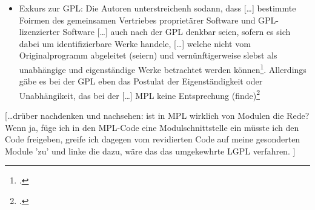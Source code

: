 \documentclass[DIV=calc,BCOR=5mm,11pt,headings=small,oneside,abstract=true, toc=bib]{scrartcl}
\begin{document}
\begin{itemize}
 \glqq{}[\ldots] dass die neu hinzugefügten Module in eigenständigen
 Dateien vorliegen, die selbst keine Bestandteile des Originalcodes
 enthalten\grqq{}\footcite[vgl.][354]{ArlBriVol2004a}
 \item Exkurs zur GPL: Die Autoren unterstreichenh sodann, dass \glqq{}[\ldots]
 bestimmte Foirmen des gemeinsamen Vertriebes proprietärer Software und
 GPL-lizenzierter Software [\ldots] auch nach der GPL denkbar seien\grqq{},
 sofern es sich dabei um identifizierbare Werke handele, \glqq{}[\ldots]
 welche nicht vom Originalprogramm abgeleitet (seiern) und
 vernünftigerweise slebst als unabhängige und eigenständige Werke
 betrachtet werden können\grqq{}\footcite[vgl.][354]{ArlBriVol2004a}. Allerdings
 gäbe es bei der GPL eben das Postulat der \glqq{}Eigenständigkeit\grqq{} oder
 \glqq{}Unabhängikeit\grqq{}, das bei der \glqq{}[\ldots] MPL keine
 Entsprechung (finde)\grqq{}\footcite[vgl.][355]{ArlBriVol2004a}
\end{itemize}



[\ldots drüber nachdenken und nachsehen: ist in MPL wirklich von Modulen die
Rede? Wenn ja, füge ich in den MPL-Code eine Modulschnittstelle ein müsste ich
den Code freigeben, greife ich dagegen vom revidierten Code auf meine
gesonderten Module 'zu' und linke die dazu, wäre das das umgekewhrte LGPL
verfahren. ]

\small

\end{document}
